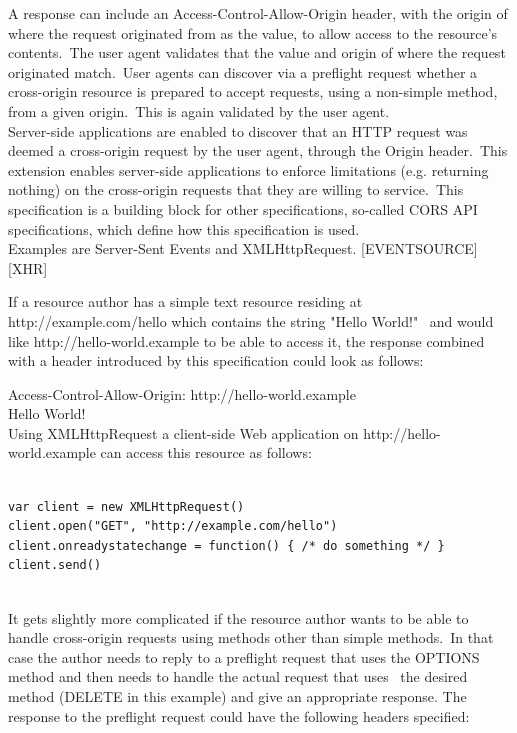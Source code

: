 \documentclass[a4paper,12pt]{paper}
\begin{document}
A response can include an Access-Control-Allow-Origin header, with the origin of where the request originated from as the value, to allow access to the resource's contents.\
The user agent validates that the value and origin of where the request originated match.\
User agents can discover via a preflight request whether a cross-origin resource is prepared to accept requests, using a non-simple method, from a given origin.\
This is again validated by the user agent.\\

Server-side applications are enabled to discover that an HTTP request was deemed a cross-origin request by the user agent, through the Origin header.\
This extension enables server-side applications to enforce limitations (e.g. returning nothing) on the cross-origin requests that they are willing to service.\
This specification is a building block for other specifications, so-called CORS API specifications, which define how this specification is used.\\
Examples are Server-Sent Events and XMLHttpRequest. [EVENTSOURCE] [XHR]

If a resource author has a simple text resource residing at http://example.com/hello which contains the string "Hello World!" \
and would like http://hello-world.example to be able to access it, the response combined with a header introduced by this specification could look as follows:\

Access-Control-Allow-Origin: http://hello-world.example\\

Hello World!\\

Using XMLHttpRequest a client-side Web application on http://hello-world.example can access this resource as follows:\\
\begin{verbatim}

var client = new XMLHttpRequest()
client.open("GET", "http://example.com/hello")
client.onreadystatechange = function() { /* do something */ }
client.send()
 
\end{verbatim}

It gets slightly more complicated if the resource author wants to be able to handle cross-origin requests using methods other than simple methods.\
In that case the author needs to reply to a preflight request that uses the OPTIONS method and then needs to handle the actual request that uses \
the desired method (DELETE in this example) and give an appropriate response. The response to the preflight request could have the following headers specified:\\
\end{document}
